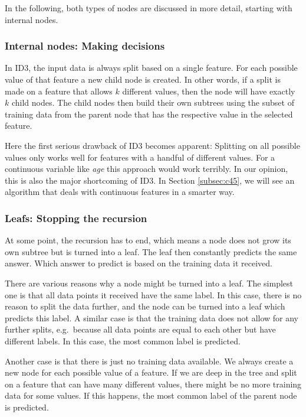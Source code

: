 \documentclass[a4paper]{article}
\begin{document}
In the following, both types of nodes are discussed in more detail, starting with internal nodes.

\subsubsection{Internal nodes: Making decisions}

In ID3, the input data is always split based on a single feature. For each possible value of that feature a new child node is created.
In other words, if a split is made on a feature that allows $k$ different values, then the node will have exactly $k$ child nodes.
The child nodes then build their own subtrees using the subset of training data from the parent node that has the respective value in the selected feature.

Here the first serious drawback of ID3 becomes apparent: Splitting on all possible values only works well for features with a handful of different values. For a continuous variable like \emph{age} this approach would work terribly. In our opinion, this is also the major shortcoming of ID3. In Section \ref{subsec:c45}, we will see an algorithm that deals with continuous features in a smarter way.

\subsubsection{Leafs: Stopping the recursion}

At some point, the recursion has to end, which means a node does not grow its own subtree but is turned into a leaf. The leaf then constantly predicts the same answer. Which answer to predict is based on the training data it received.

There are various reasons why a node might be turned into a leaf. The simplest one is that all data points it received have the same label. In this case, there is no reason to split the data further, and the node can be turned into a leaf which predicts this label. A similar case is that the training data does not allow for any further splits, e.g.\ because all data points are equal to each other but have different labels. In this case, the most common label is predicted.

Another case is that there is just no training data available. We always create a new node for each possible value of a feature. If we are deep in the tree and split on a feature that can have many different values, there might be no more training data for some values. If this happens, the most common label of the parent node is predicted.
\end{document}
